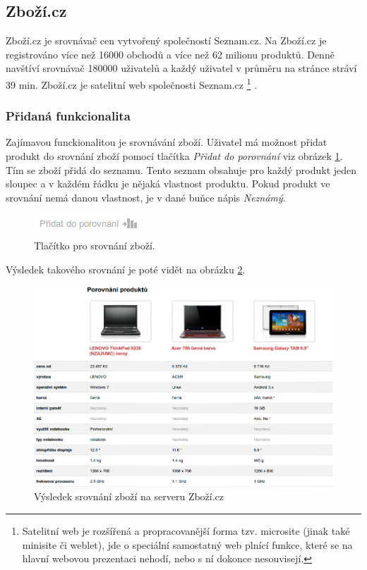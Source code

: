 \subsection{Zboží.cz}
Zboží.cz je srovnávač cen vytvořený společností Seznam.cz. Na Zboží.cz je registrováno více než 16000 obchodů a více než 62 milionu produktů. Denně navštíví srovnávač 180000 uživatelů a každý uživatel v průměru na stránce stráví 39 min.\cite{website:zbozi-about}
Zboží.cz je satelitní web společnosti Seznam.cz
\footnote{Satelitní web je rozšířená a propracovanější forma tzv. microsite (jinak také minisite či weblet), jde o speciální samostatný web plnící funkce, které se na hlavní webovou prezentaci nehodí, nebo s ní dokonce nesouvisejí.}
.
\subsubsection{Přidaná funkcionalita}
Zajímavou funckionalitou je srovnávání zboží. Uživatel má možnost přidat produkt do srovnání zboží pomocí tlačítka \emph{Přidat do porovnání} viz obrázek \ref{fig:zbozicz-srovnat}. Tím se zboží přidá do seznamu. Tento seznam obsahuje pro každý produkt jeden sloupec a v každém řádku je nějaká vlastnost produktu. Pokud produkt ve srovnání nemá danou vlastnost, je v dané buňce nápis \emph{Neznámý}.

\begin{figure}[htb]
\begin{center}
\includegraphics[width=40mm]{./pictures/zbozicz-srovnat.png}
\caption{Tlačítko pro srovnání zboží.}
\label{fig:zbozicz-srovnat}
\end{center}
\end{figure}

Výsledek takového srovnání je poté vidět na obrázku \ref{fig:zbozicz-srovnani}.

\begin{figure}[htb]
\begin{center}
\includegraphics[width=130mm]{./pictures/zbozicz-srovnani.png}
\caption{Výsledek srovnání zboží na serveru Zboží.cz}
\label{fig:zbozicz-srovnani}
\end{center}
\end{figure}

